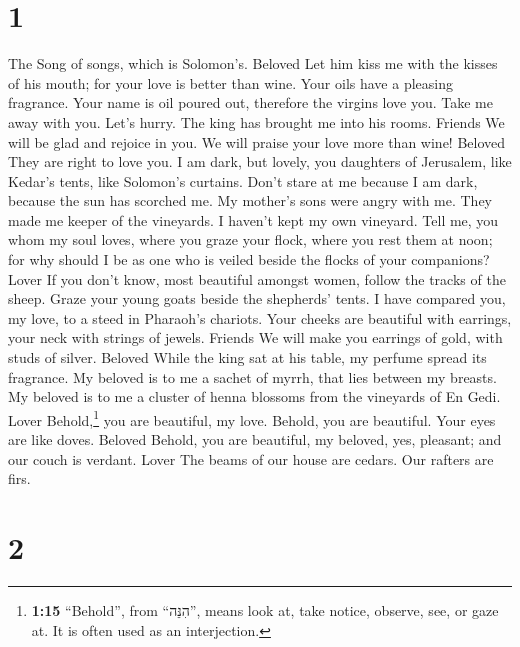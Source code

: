 \hypertarget{section}{%
\section{1}\label{section}}

 The Song of songs, which is Solomon's. Beloved
 Let him kiss me with the kisses of his mouth; for your
love is better than wine.  Your oils have a pleasing
fragrance. Your name is oil poured out, therefore the virgins love you.
 Take me away with you. Let's hurry. The king has brought
me into his rooms. Friends We will be glad and rejoice in you. We will
praise your love more than wine! Beloved They are right to love you.
 I am dark, but lovely, you daughters of Jerusalem, like
Kedar's tents, like Solomon's curtains.  Don't stare at me
because I am dark, because the sun has scorched me. My mother's sons
were angry with me. They made me keeper of the vineyards. I haven't kept
my own vineyard.  Tell me, you whom my soul loves, where
you graze your flock, where you rest them at noon; for why should I be
as one who is veiled beside the flocks of your companions? Lover
 If you don't know, most beautiful amongst women, follow
the tracks of the sheep. Graze your young goats beside the shepherds'
tents.  I have compared you, my love, to a steed in
Pharaoh's chariots.  Your cheeks are beautiful with
earrings, your neck with strings of jewels. Friends  We
will make you earrings of gold, with studs of silver. Beloved
 While the king sat at his table, my perfume spread its
fragrance.  My beloved is to me a sachet of myrrh, that
lies between my breasts.  My beloved is to me a cluster
of henna blossoms from the vineyards of En Gedi. Lover 
Behold,\footnote{\textbf{1:15} ``Behold'', from ``הִנֵּה'', means look
  at, take notice, observe, see, or gaze at. It is often used as an
  interjection.} you are beautiful, my love. Behold, you are beautiful.
Your eyes are like doves. Beloved  Behold, you are
beautiful, my beloved, yes, pleasant; and our couch is verdant. Lover
 The beams of our house are cedars. Our rafters are firs.

\hypertarget{section-1}{%
\section{2}\label{section-1}}

